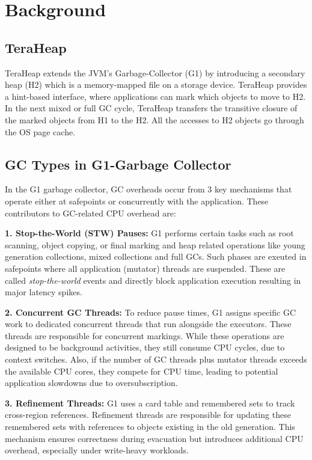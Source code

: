\section{Background}



\subsection{TeraHeap}
TeraHeap extends the JVM's Garbage-Collector (G1) by introducing a
secondary heap (H2) which is a memory-mapped file on a storage device. TeraHeap
provides a hint-based interface, where applications can mark which objects to
move to H2. In the next mixed or full GC cycle, TeraHeap transfers the
transitive closure of the marked objects from H1 to the H2. All the accesses to
H2 objects go through the OS page cache.

\subsection{GC Types in G1-Garbage Collector} In the G1 garbage collector, GC
overheads occur from 3 key mechanisms that operate either at safepoints or
concurrently with the application. These contributors to GC-related CPU
overhead are:

\textbf{1. Stop-the-World (STW) Pauses:}  G1 performs certain tasks such as
root scanning, object copying, or final marking and heap related operations
like young generation collections, mixed collections and full GCs. Such phases
are exeuted in safepoints where all application (mutator) threads are
suspended. These are called \emph{stop-the-world} events and directly block
application execution resulting in major latency spikes.

\textbf{2. Concurrent GC Threads:}  To reduce pause times, G1 assigns specific
GC work to dedicated concurrent threads that run alongside the executors. These
threads are responsible for concurrent markings. While these operations are
designed to be background activities, they still consume CPU cycles, due to
context switches. Also, if the number of GC threads plus mutator threads
exceeds the available CPU cores, they compete for CPU time, leading to
potential application slowdowns due to oversubscription.

\textbf{3. Refinement Threads:}  G1 uses a card table and remembered sets to
track cross-region references. Refinement threads are responsible for updating
these remembered sets with references to objects existing in the old
generation. This mechanism ensures correctness during evacuation but introduces
additional CPU overhead, especially under write-heavy workloads.


